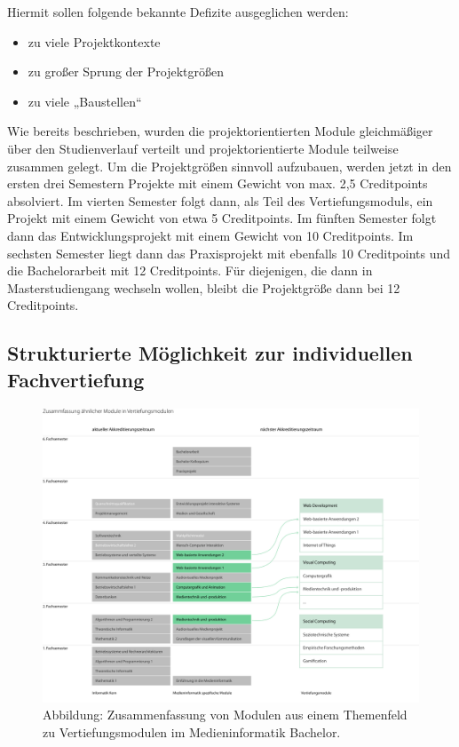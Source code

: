 Hiermit sollen folgende bekannte Defizite ausgeglichen werden:

\begin{itemize}
\tightlist
\item
  zu viele Projektkontexte
\item
  zu großer Sprung der Projektgrößen
\item
  zu viele „Baustellen``
\end{itemize}

Wie bereits beschrieben, wurden die projektorientierten Module
gleichmäßiger über den Studienverlauf verteilt und projektorientierte
Module teilweise zusammen gelegt. Um die Projektgrößen sinnvoll
aufzubauen, werden jetzt in den ersten drei Semestern Projekte mit einem
Gewicht von max. 2,5 Creditpoints absolviert. Im vierten Semester folgt
dann, als Teil des Vertiefungsmoduls, ein Projekt mit einem Gewicht von
etwa 5 Creditpoints. Im fünften Semester folgt dann das
Entwicklungsprojekt mit einem Gewicht von 10 Creditpoints. Im sechsten
Semester liegt dann das Praxisprojekt mit ebenfalls 10 Creditpoints und
die Bachelorarbeit mit 12 Creditpoints. Für diejenigen, die dann in
Masterstudiengang wechseln wollen, bleibt die Projektgröße dann bei 12
Creditpoints.

\subsection{Strukturierte Möglichkeit zur individuellen
Fachvertiefung}\label{strukturierte-muxf6glichkeit-zur-individuellen-fachvertiefung}

\begin{figure}[htbp][htbp]
\centering
\includegraphics[width=\columnwidth]{../anhaenge/bilder/ba-vertiefungen.png}
\caption{Abbildung: Zusammenfassung von Modulen aus einem Themenfeld zu
Vertiefungsmodulen im Medieninformatik Bachelor.}
\end{figure}

